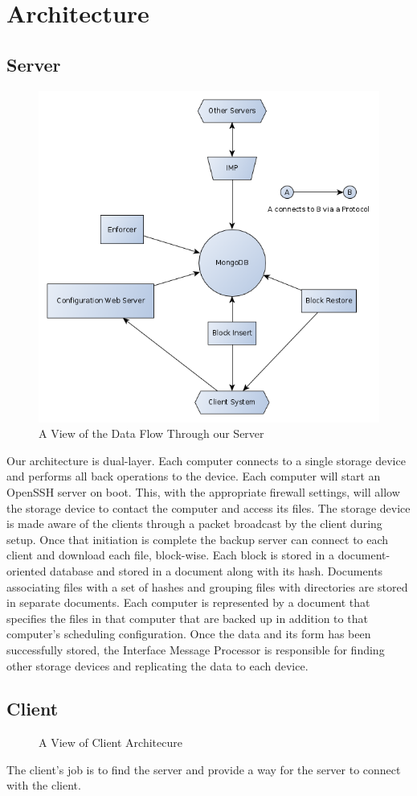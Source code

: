 \chapter{Architecture}
\section{Server}

\begin{figure}[hb]
\centering
\includegraphics[scale=0.5]{images/architechure-diagram.png}
\caption{A View of the Data Flow Through our Server}
\end{figure}

Our architecture is dual-layer. Each computer connects to a single storage
device and performs all back operations to the device. Each computer will start
an OpenSSH server on boot. This, with the appropriate firewall settings, will
allow the storage device to contact the computer and access its files. The
storage device is made aware of the clients through a packet broadcast by the
client during setup. Once that initiation is complete the backup server can
connect to each client and download each file, block-wise. Each block is stored
in a document-oriented database and stored in a document along with its hash.
Documents associating files with a set of hashes and grouping files with
directories are stored in separate documents. Each computer is represented by a
document that specifies the files in that computer that are backed up in
addition to that computer's scheduling configuration. Once the data and its form
has been successfully stored, the Interface Message Processor is responsible for
finding other storage devices and replicating the data to each device.

\section{Client}
\begin{figure}[hb]
\centering
\caption{A View of Client Architecure}
\end{figure}

The client's job is to find the server and provide a way for the server to connect with the client.
